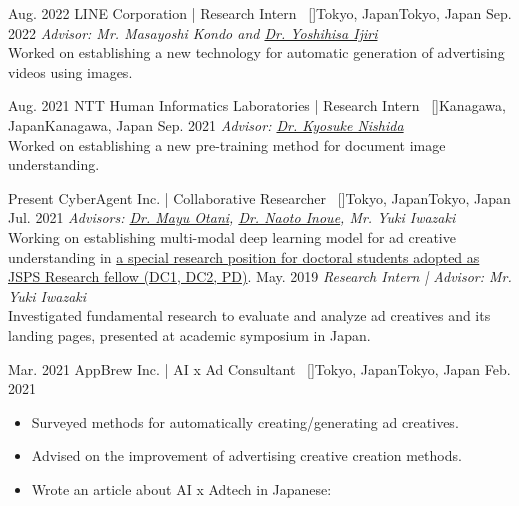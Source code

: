 
\begin{experiences}
    \researchexperience
    {Aug. 2022}   {LINE Corporation | Research Intern{\normalfont  ~ [\href{https://linecorp.com/en/}{\small{\websiteSymbol}}]}}{Tokyo, Japan}{Tokyo, Japan}
    {Sep. 2022} {\textit{Advisor: Mr. Masayoshi Kondo and \href{https://scholar.google.co.jp/citations?user=VVoeVYIAAAAJ}{Dr. Yoshihisa Ijiri}}\\
    Worked on establishing a new technology for automatic generation of advertising videos using images.
    }

    \emptySeparator
    \researchexperience
    {Aug. 2021}   {NTT Human Informatics Laboratories | Research Intern{\normalfont  ~ [\href{https://www.rd.ntt/e/hil/}{\small{\websiteSymbol}}]}}{Kanagawa, Japan}{Kanagawa, Japan}
    {Sep. 2021} {\textit{Advisor: \href{https://www.knishida.info/}{Dr. Kyosuke Nishida}}\\
    Worked on establishing a new pre-training method for document image understanding.
    }

    \emptySeparator
    \researchexperience
    {Present}   {CyberAgent Inc. | Collaborative Researcher{\normalfont  ~ [\href{https://www.cyberagent.co.jp/news/detail/id=26231}{\small{\websiteSymbol}}]}}{Tokyo, Japan}{Tokyo, Japan}
    {Jul. 2021} {\textit{Advisors: \href{https://mayu-ot.github.io/}{Dr. Mayu Otani}, \href{https://naoto0804.github.io/}{Dr. Naoto Inoue}, {Mr. Yuki Iwazaki}}\\
    Working on establishing multi-modal deep learning model for ad creative understanding in \href{https://www.cyberagent.co.jp/news/detail/id=26231}{a special research position for doctoral students adopted as JSPS Research fellow (DC1, DC2, PD)}.
    \vskip 0.1cm
    }
    \researchexperience
    {}   {}{}{}
    {May. 2019} {\textit{Research Intern | Advisor: {Mr. Yuki Iwazaki}}\\
    Investigated fundamental research to evaluate and analyze ad creatives and its landing pages, presented at academic symposium in Japan.
    }

    \emptySeparator
    \researchexperience
    {Mar. 2021}   {AppBrew Inc. | AI x Ad Consultant{\normalfont  ~ [\href{https://appbrew.io/}{\small{\websiteSymbol}}]}}{Tokyo, Japan}{Tokyo, Japan}
    {Feb. 2021} {
    \begin{itemize}
        \item Surveyed methods for automatically creating/generating ad creatives.
        \item Advised on the improvement of advertising creative creation methods.
        \item Wrote an article about AI x Adtech in Japanese:
    \end{itemize}
    }


\end{experiences}
